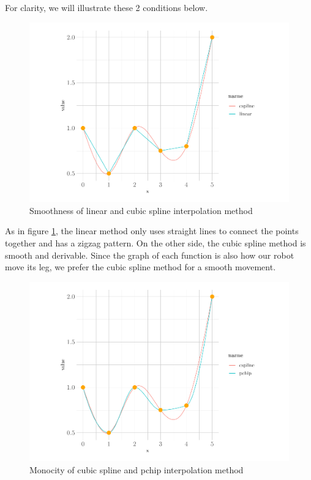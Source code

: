 \documentclass[a4paper, xcolor = usenames,dvipsnames]{article}
\begin{document}
For clarity, we will illustrate these 2 conditions below.

\begin{figure}

{\centering \includegraphics{report_files/figure-latex/smooth-plot-1} 

}

\caption{Smoothness of linear and cubic spline interpolation method}\label{fig:smooth-plot}
\end{figure}

As in figure \ref{fig:smooth-plot}, the linear method only uses straight lines to connect the points together and has a zigzag pattern. On the other side, the cubic spline method is smooth and derivable. Since the graph of each function is also how our robot move its leg, we prefer the cubic spline method for a smooth movement.

\begin{figure}

{\centering \includegraphics{report_files/figure-latex/mono-plot-1} 

}

\caption{Monocity of cubic spline and pchip interpolation method}\label{fig:mono-plot}
\end{figure}
\end{document}

